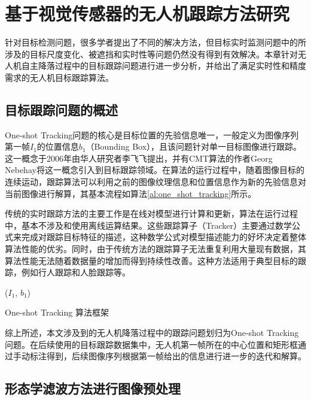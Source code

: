\chapter{基于视觉传感器的无人机跟踪方法研究}

针对目标检测问题，很多学者提出了不同的解决方法，但目标实时监测问题中的所涉及的目标尺度变化、被遮挡和实时性等问题仍然没有得到有效解决。本章针对无人机自主降落过程中的目标跟踪问题进行进一步分析，并给出了满足实时性和精度需求的无人机目标跟踪算法。

\section{目标跟踪问题的概述}
One-shot Tracking问题的核心是目标位置的先验信息唯一，一般定义为图像序列第一帧$I_1$的位置信息$b_1$（Bounding Box），且该问题针对单一目标图像进行跟踪。这一概念于2006年由华人研究者李飞飞提出\cite{fei2006one}，并有CMT算法\cite{Nebehay2016}的作者Georg Nebehay将这一概念引入到目标跟踪领域。在算法的运行过程中，随着图像目标的连续运动，跟踪算法可以利用之前的图像纹理信息和位置信息作为新的先验信息对当前图像进行解算，其基本流程如算法\ref{al:one_shot_tracking}所示。

传统的实时跟踪方法的主要工作是在线对模型进行计算和更新，算法在运行过程中，基本不涉及和使用离线运算结果。这些跟踪算子（Tracker）主要通过数学公式来完成对跟踪目标特征的描述，这种数学公式对模型描述能力的好坏决定着整体算法性能的优劣。同时，由于传统方法的跟踪算子无法重复利用大量现有数据，其算法性能无法随着数据量的增加而得到持续性改善。这种方法适用于典型目标的跟踪，例如行人跟踪和人脸跟踪等。

\begin{algorithm2e}[H]
	\SetAlgoLined
	\BlankLine
	\Initialization($I_1$, $b_1$)\;
	\caption{One-shot Tracking 算法框架}
	\label{al:one_shot_tracking}
\end{algorithm2e}
综上所述，本文涉及到的无人机降落过程中的跟踪问题划归为One-shot Tracking问题。在后续使用的目标跟踪数据集中，无人机第一帧所在的中心位置和矩形框通过手动标注得到，后续图像序列根据第一帧给出的信息进行进一步的迭代和解算。

\section{形态学滤波方法进行图像预处理}

